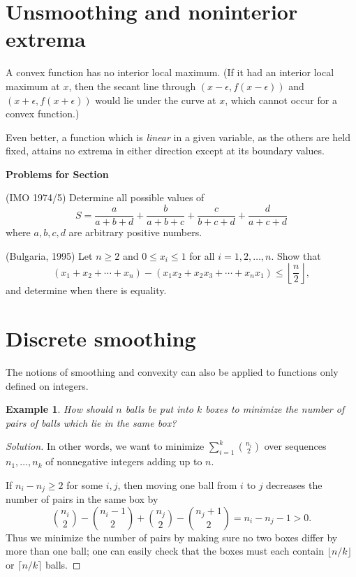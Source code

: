 \documentclass[12pt]{report}
\newtheorem{problem}[theorem]{Example}
\def\ii{\item}
\newcounter{exc}
\numberwithin{exc}{section}
\newenvironment{exer}{\vspace{0.1in}
\noindent \textbf{Problems for Section~\thesection} \vspace{0.1in}
\begin{list}{\arabic{exc}.}{\usecounter{exc}}}{\end{list}}
\begin{document}
\section{Unsmoothing and noninterior extrema}

A convex function has no interior local maximum. (If it had an interior
local maximum at $x$, then the secant line through $(x-\epsilon,
f(x-\epsilon))$ and $(x + \epsilon, f(x+\epsilon))$ would lie under the
curve at $x$, which cannot occur for a convex function.)

Even better, a function which is \emph{linear} in a given variable, as
the others are held fixed, attains no extrema in either direction
except at its boundary values.

\begin{exer}
\ii (IMO 1974/5) Determine all possible values of 
\[ S= \frac{a}{a+b+d} + \frac{b}{a + b+c} + \frac{c}{b+c+d} + \frac{d}{a+c+d}\]
where $a,b,c,d$ are arbitrary positive numbers.
\ii (Bulgaria, 1995)
Let $n \geq 2$ and $0 \leq x_{i} \leq 1$ for all $i=1,2,\dots, n$. 
Show that
\[
(x_{1} + x_{2} + \cdots + x_{n}) - (x_{1}x_{2} + x_{2}x_{3} + \cdots + 
x_{n}x_{1}) \leq \left\lfloor \frac{n}{2} \right\rfloor,
\]
and determine when there is equality.
\end{exer}

\section{Discrete smoothing}
The notions of smoothing and convexity can also be applied to 
functions only defined on integers.

\begin{problem}
How should $n$ balls be put into $k$ boxes to minimize the number of 
pairs of balls which lie in the same box?
\end{problem}
\begin{proof}[Solution]
In other words, we want to minimize $\sum_{i=1}^{k} \binom{n_{i}}{2}$ 
over sequences $n_{1}, \dots, n_{k}$ of nonnegative integers adding 
up to $n$.

If $n_{i} - n_{j} \geq 2$ for some $i,j$, then moving one ball from 
$i$ to $j$ decreases the number of pairs in the same box by
\[
\binom{n_{i}}{2} - \binom{n_{i}-1}{2} + \binom{n_{j}}{2} - 
\binom{n_{j}+1}{2} = n_{i} - n_{j} - 1 > 0.
\]
Thus we minimize the number of pairs by making sure no two boxes 
differ by more than one ball; one can easily check that the boxes must 
each contain $\lfloor n/k\rfloor$ or $\lceil n/k \rceil$ balls.
\end{proof}
\end{document}
